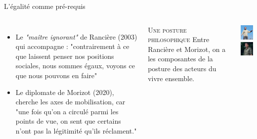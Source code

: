 \documentclass[newPxFont]{beamer}
\begin{document}
\begin{frame}[c]{L'égalité comme pré-requis}
  \vspace{-1cm}
  \begin{columns}[onlytextwidth,T]
    \column{\dimexpr\linewidth-30mm-5mm}
        \begin{itemize}
          \item Le \textit{"maître ignorant"} de Rancière (2003) qui accompagne : "contrairement à ce que laissent penser nos positions sociales, nous sommes égaux, voyons ce que nous pouvons en faire" 
          \item Le diplomate de Morizot (2020),  cherche les axes de mobilisation, car "une fois qu’on a circulé parmi les points de vue, on sent que certains n’ont pas la légitimité qu’ils réclament."
        \end{itemize}
  
        \small{
            \begin{alertblock}{\textsc{Une posture philosophique}}
              Entre Rancière et Morizot, on a les composantes de la posture des acteurs du vivre ensemble.
            \end{alertblock}
          }
    \column{30mm}
    \vspace{0.5cm}
          \includegraphics[width=3cm]{img/Ranciere.jpg}\\
          \includegraphics[width=3cm]{img/morizot.jpg}
  \end{columns}
\end{frame}
\end{document}
